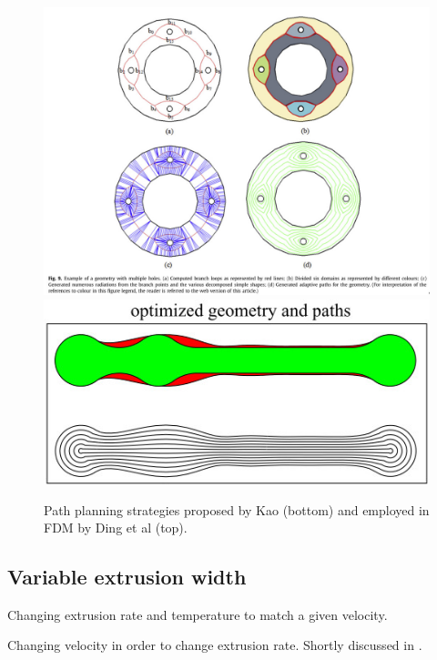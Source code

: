 \begin{figure}
\centering
\includegraphics[width=\columnwidth]{sources/related_work/ding.jpg}
\includegraphics[width=.7\columnwidth]{sources/related_work/kao.jpg}
\caption{Path planning strategies proposed by Kao (bottom) and employed in FDM by Ding et al (top).}
\label{ding}
\end{figure}

\subsection{Variable extrusion width}

Changing extrusion rate and temperature to match a given velocity. \cite{Ertay2018}

Changing velocity in order to change extrusion rate.
Shortly discussed in \cite{Kuipers2018}.
